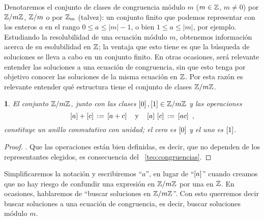 \theoremstyle{plain}
\newtheorem{teoModulares}{\teoname}[section]
\newtheorem{coroModulares}[teoModulares]{\coroname}
\newtheorem{lemaModulares}[teoModulares]{\lemaname}

\theoremstyle{definition}
\newtheorem{defModulares}[teoModulares]{}
\newtheorem{obsModulares}[teoModulares]{\obsname}
\newtheorem{ejemModulares}[teoModulares]{\ejemname}


Denotaremos el conjunto de clases de congruencia m\'odulo $m$
($m\in\Enteros$, $m\neq 0$) por $\Enterosmod[m]$, $\simEnterosmod[m]$ o por
$\varEnterosmod[m]$ (talvez): un conjunto finito que podemos representar con
los enteros $a$ en el rango $0\leq a\leq |m|-1$, o bien $1\leq a\leq |m|$,
por ejemplo. Estudiando la resolubilidad de una ecuaci\'on m\'odulo $m$,
obtenemos informaci\'on acerca de su esolubilidad en $\Enteros$; la ventaja
que esto tiene es que la b\'usqueda de soluciones se lleva a cabo en un
conjunto finito. En otras ocasiones, ser\'a relevante entender las soluciones
a una ecuaci\'on de congruencia, sin que esto tenga por objetivo conocer
las soluciones de la misma ecuaci\'on en $\Enteros$. Por esta raz\'on es
relevante entender qu\'e estructura tiene el conjunto de clases
$\Enterosmod[m]$.

\begin{teoModulares}\label{teo:modulares}
	El conjunto $\Enterosmod[m]$, junto con las clases
	$\clase 0,\clase 1\in\Enterosmod[m]$ y las operaciones
	\begin{displaymath}
		\clase a+\clase c\,:=\,\clase{a+c}
		\quad\text{y}\quad
		\clase a\,\clase c\,:=\,\clase{ac}
		\text{ ,}
	\end{displaymath}
	constituye un anillo conmutativo con unidad; el cero es $\clase 0$ y
	el uno es $\clase 1$.
\end{teoModulares}

\begin{proof}
	\quedacomoejercicio. Que las operaciones est\'an bien definidas,
	es decir, que no dependen de los representantes elegidos, es
	consecuencia del \teoname~\ref{teo:congruencias}.
\end{proof}

Simplificaremos la notaci\'on y escribiremos ``$a$'', en lugar de
``$\clase a$'' cuando creamos que no hay riesgo de confundir una expresi\'on
en $\Enterosmod[m]$ por una en $\Enteros$. En ocasiones, hablaremos de
``buscar soluciones en $\Enterosmod[m]$''. Con esto querremos decir buscar
soluciones a una ecuaci\'on de congruencia, es decir, buscar soluciones
m\'odulo $m$.

